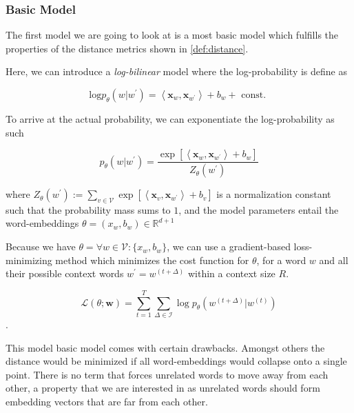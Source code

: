 \documentclass[a4paper,12pt,twoside,openright]{report}
\begin{document}
\subsubsection{Basic Model}

The first model we are going to look at is a most basic model which fulfills the properties of the distance metrics shown in \eqref{def:distance}.

Here, we can introduce a \textit{log-bilinear} model where the log-probability is define as

\begin{equation}
\text{log} p_{\theta}(w | w^{\prime}) = \left\langle\mathbf{x}_{w}, \mathbf{x}_{w^{\prime}}\right\rangle+b_{w} + \text { const. }
\end{equation}

To arrive at the actual probability, we can exponentiate the log-probability as such

$$
p_{\theta}\left(w | w^{\prime}\right)=\frac{\exp \left[\left\langle\mathbf{x}_{w}, \mathbf{x}_{w^{\prime}}\right\rangle+b_{w}\right]}{Z_{\theta}\left(w^{\prime}\right)}
$$

where $Z_{\theta}\left(w^{\prime}\right):=\sum_{v \in \mathcal{V}} \exp \left[\left\langle\mathbf{x}_{v}, \mathbf{x}_{w^{\prime}}\right\rangle+b_{v}\right]$ is a normalization constant such that the probability mass sums to $1$, and the model parameters entail the word-embeddings $\theta = (x_w, b_w) \in \mathbb{R}^{d+1}$


Because we have $\theta = \forall w \in \mathcal{V} : \{ x_w, b_w \}$, we can use a gradient-based loss-minimizing method which minimizes the cost function for $\theta$, for a word $w$ and all their possible context words $w^{\prime} = w^{(t+\Delta)}$ within a context size $R$.

$$
\mathcal{L}(\theta ; \mathbf{w})=\sum_{t=1}^{T} \sum_{\Delta \in \mathcal{I}} \log p_{\theta}\left(w^{(t+\Delta)} | w^{(t)}\right)
$$.

This model basic model comes with certain drawbacks. 
Amongst others the distance would be minimized if all word-embeddings would collapse onto a single point. 
There is no term that forces unrelated words to move away from each other, a property that we are interested in as unrelated words should form embedding vectors that are far from each other.
\end{document}
